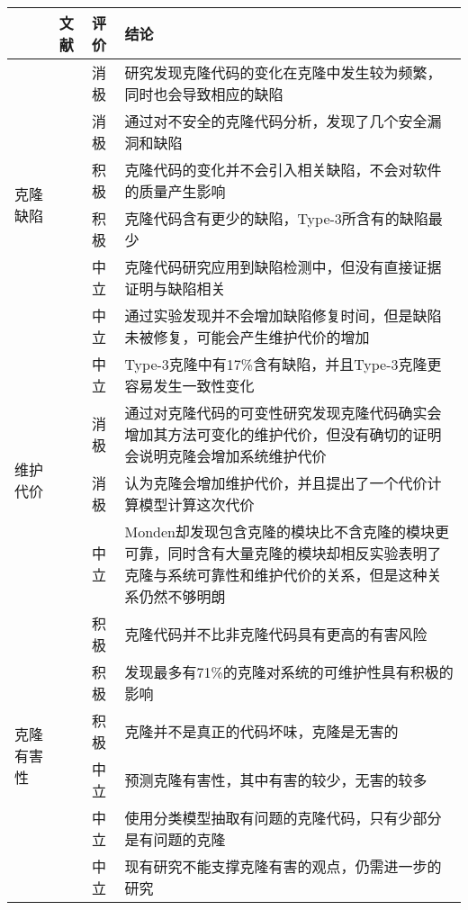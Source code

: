 \begin{table}[htbp]
\centering
{}\vspace{0.5em}\wuhao
\begin{tabularx}{0.9\textwidth}{lllX}
\toprule[1.5pt]
&文献&评价&结论\\
\midrule[1pt]
\multirow{6}{*}{{克隆缺陷}} 
&\cite{juergens2009code}&消极&研究发现克隆代码的变化在克隆中发生较为频繁，同时也会导致相应的缺陷\\
&\cite{gauthier2013uncovering}&消极&通过对不安全的克隆代码分析，发现了几个安全漏洞和缺陷\\
&\cite{bettenburg2009empirical}&积极&克隆代码的变化并不会引入相关缺陷，不会对软件的质量产生影响\\
&\cite{elish2015fault}&积极&克隆代码含有更少的缺陷，Type-3所含有的缺陷最少\\
&\cite{lo2012active}&中立&克隆代码研究应用到缺陷检测中，但没有直接证据证明与缺陷相关\\
&\cite{kamei2011empirical}&中立	&通过实验发现并不会增加缺陷修复时间，但是缺陷未被修复，可能会产生维护代价的增加\\
\midrule[1pt]
\multirow{4}{*}{{维护代价}} 
&\cite{wagner2016relationship}&中立	&Type-3克隆中有17\%含有缺陷，并且Type-3克隆更容易发生一致性变化\\
&\cite{harder2012controlled}&消极&通过对克隆代码的可变性研究发现克隆代码确实会增加其方法可变化的维护代价，但没有确切的证明会说明克隆会增加系统维护代价\\
&\cite{juergens2010much}&消极&认为克隆会增加维护代价，并且提出了一个代价计算模型计算这次代价\\
&\cite{monden2002software}&中立&Monden却发现包含克隆的模块比不含克隆的模块更可靠，同时含有大量克隆的模块却相反实验表明了克隆与系统可靠性和维护代价的关系，但是这种关系仍然不够明朗\\
\midrule[1pt]
\multirow{6}{*}{{克隆有害性}} 
&\cite{selim2010studying}&积极&克隆代码并不比非克隆代码具有更高的有害风险\\
&\cite{kapser2006cloning}\cite{kapser2008cloning}&积极	&发现最多有71\%的克隆对系统的可维护性具有积极的影响\\
&\cite{rahman2012clones}&积极	&克隆并不是真正的代码坏味，克隆是无害的\\
&\cite{wang2012can}&中立	&预测克隆有害性，其中有害的较少，无害的较多\\
&\cite{higo2009problematic}&中立&使用分类模型抽取有问题的克隆代码，只有少部分是有问题的克隆\\
&\cite{hordijk2009harmfulness}&中立&现有研究不能支撑克隆有害的观点，仍需进一步的研究\\
\bottomrule[1.5pt]
\end{tabularx}
\end{table}

